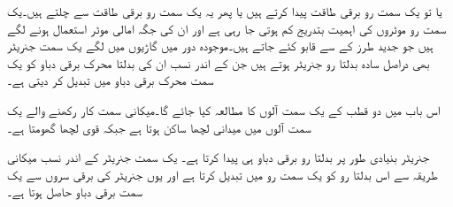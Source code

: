  یا تو یک سمت  رو برقی طاقت پیدا کرتے ہیں یا پھر یہ یک سمت  رو برقی طاقت سے چلتے ہیں۔یک سمت  رو موٹروں کی اہمیت بتدریج کم ہوتی جا رہی ہے اور ان کی جگہ امالی موٹر استعمال ہونے لگے ہیں جو جدید طرز کے  سے قابو کئے جاتے ہیں۔موجودہ دور میں گاڑیوں میں لگے یک سمت  جنریٹر بھی دراصل سادہ بدلتا رو جنریٹر ہوتے ہیں جن کے اندر نسب  ان کی بدلتا محرک برقی دباو کو یک سمت  محرک برقی دباو میں تبدیل کر دیتی ہے۔

اس باب میں دو قطب کے یک سمت  آلوں کا مطالعہ کیا جائے گا۔میکانی سمت کار رکھنے والے یک سمت  آلوں میں میدانی لچھا ساکن ہوتا ہے جبکہ قوی لچھا گھومتا ہے۔

جنریٹر بنیادی طور پر بدلتا رو برقی دباو ہی پیدا کرتا ہے۔ یک سمت  جنریٹر کے اندر نسب   میکانی طریقہ سے اس بدلتا رو کو یک سمت  رو میں تبدیل کرتا ہے اور یوں جنریٹر کی برقی سروں سے یک سمت  برقی دباو حاصل ہوتا ہے۔

